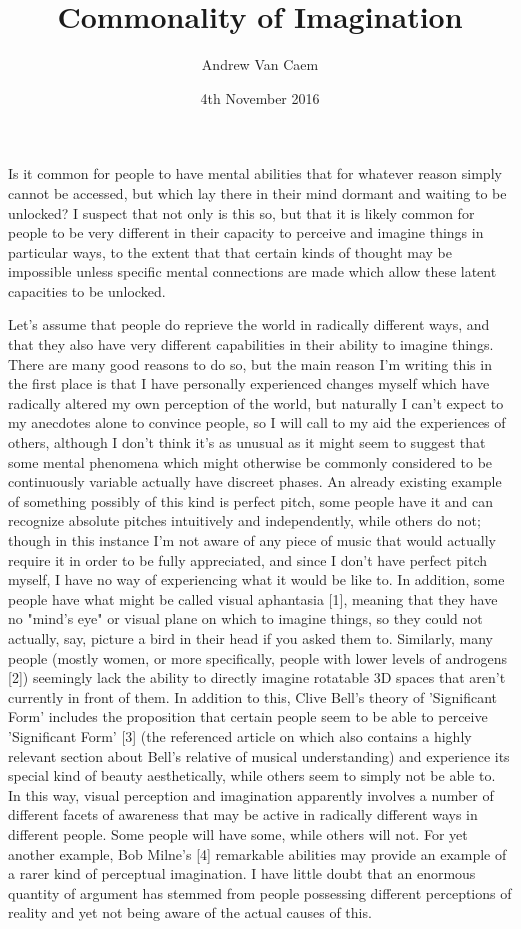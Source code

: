 \documentclass[]{article}
\title{Commonality of Imagination}
\author{Andrew Van Caem}
\date{4th November 2016}
\begin{document}
\maketitle

Is it common for people to have mental abilities that for whatever reason simply cannot be accessed, but which lay there in their mind dormant and waiting to be unlocked? I suspect that not only is this so, but that it is likely common for people to be very different in their capacity to perceive and imagine things in particular ways, to the extent that that certain kinds of thought may be impossible unless specific mental connections are made which allow these latent capacities to be unlocked.

Let's assume that people do reprieve the world in radically different ways, and that they also have very different capabilities in their ability to imagine things. There are many good reasons to do so, but the main reason I'm writing this in the first place is that I have personally experienced changes myself which have radically altered my own perception of the world, but naturally I can't expect to my anecdotes alone to convince people, so I will call to my aid the experiences of others, although I don't think it's as unusual as it might seem to suggest that some mental phenomena which might otherwise be commonly considered to be continuously variable actually have discreet phases. An already existing example of something possibly of this kind is perfect pitch, some people have it and can recognize absolute pitches intuitively and independently, while others do not; though in this instance I'm not aware of any piece of music that would actually require it in order to be fully appreciated, and since I don't have perfect pitch myself, I have no way of experiencing what it would be like to. In addition, some people have what might be called visual aphantasia [1], meaning that they have no "mind's eye" or visual plane on which to imagine things, so they could not actually, say, picture a bird in their head if you asked them to. Similarly, many people (mostly women, or more specifically, people with lower levels of androgens [2]) seemingly lack the ability to directly imagine rotatable 3D spaces that aren't currently in front of them. In addition to this, Clive Bell's theory of 'Significant Form' includes the proposition that certain people seem to be able to perceive 'Significant Form' [3] (the referenced article on which also contains a highly relevant section about Bell's relative of musical understanding) and experience its special kind of beauty aesthetically, while others seem to simply not be able to. In this way, visual perception and imagination apparently involves a number of different facets of awareness that may be active in radically different ways in different people. Some people will have some, while others will not. For yet another example, Bob Milne's [4] remarkable abilities may provide an example of a rarer kind of perceptual imagination. I have little doubt that an enormous quantity of argument has stemmed from people possessing different perceptions of reality and yet not being aware of the actual causes of this.
\end{document}
